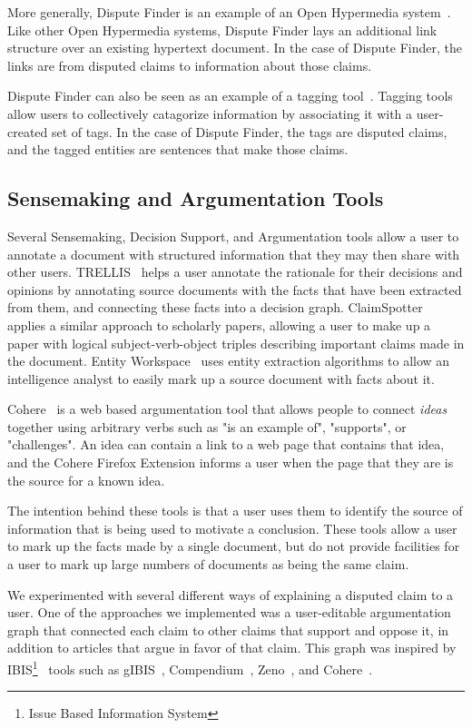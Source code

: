 \documentclass{www2010-submission}
\begin{document}
More generally, Dispute Finder is an example of an Open Hypermedia system~\cite{Bouvin2000,Wiil1996}. Like other Open Hypermedia systems, Dispute Finder lays an additional link structure over an existing hypertext document. In the case of Dispute Finder, the links are from disputed claims to information about those claims.

Dispute Finder can also be seen as an example of a tagging tool~\cite{Marlow2006,Golder2006}. Tagging tools allow users to collectively catagorize information by associating it with a user-created set of tags. In the case of Dispute Finder, the tags are disputed claims, and the tagged entities are sentences that make those claims.


\subsection{Sensemaking and Argumentation Tools}

Several Sensemaking, Decision Support, and Argumentation tools allow a user to annotate a document with structured information that they may then share with other users. TRELLIS~\cite{Gil2002} helps a user annotate the rationale for their decisions and opinions by annotating source documents with the facts that have been extracted from them, and connecting these facts into a decision graph. ClaimSpotter~\cite{Sereno2005,Sereno2004} applies a similar approach to scholarly papers, allowing a user to make up a paper with logical subject-verb-object triples describing important claims made in the document. Entity Workspace~\cite{Bier2006} uses entity extraction algorithms to allow an intelligence analyst to easily mark up a source document with facts about it.

Cohere~\cite{Shum2008} is a web based argumentation tool that allows people to connect {\it ideas} together using arbitrary verbs such as "is an example of", "supports", or "challenges". An idea can contain a link to a web page that contains that idea, and the Cohere Firefox Extension informs a user when the page that they are is the source for a known idea.

The intention behind these tools is that a user uses them to identify the source of information that is being used to motivate a conclusion. These tools allow a user to mark up the facts made by a single document, but do not provide facilities for a user to mark up large numbers of documents as being the same claim. 

We experimented with several different ways of explaining a disputed claim to a user. One of the approaches we implemented was a user-editable argumentation graph that connected each claim to other claims that support and oppose it, in addition to articles that argue in favor of that claim. This graph was inspired by IBIS\footnote{Issue Based Information System}~\cite{Rittel1973} tools such as gIBIS~\cite{Conklin1987a}, Compendium~\cite{Selvin2001}, Zeno~\cite{Gordon1997}, and Cohere~\cite{Shum2008}. 
\end{document}

